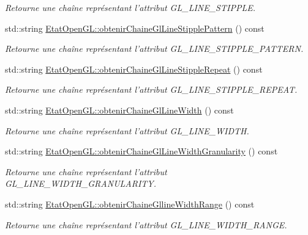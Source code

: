 \begin{DoxyCompactItemize}
\begin{DoxyCompactList}\small\item\em Retourne une chaîne représentant l'attribut G\-L\-\_\-\-L\-I\-N\-E\-\_\-\-S\-T\-I\-P\-P\-L\-E. \end{DoxyCompactList}\item 
std\-::string \hyperlink{group__utilitaire_gaf5594a01ce0e3ce08073c9d8adc2dc7d}{Etat\-Open\-G\-L\-::obtenir\-Chaine\-Gl\-Line\-Stipple\-Pattern} () const 
\begin{DoxyCompactList}\small\item\em Retourne une chaîne représentant l'attribut G\-L\-\_\-\-L\-I\-N\-E\-\_\-\-S\-T\-I\-P\-P\-L\-E\-\_\-\-P\-A\-T\-T\-E\-R\-N. \end{DoxyCompactList}\item 
std\-::string \hyperlink{group__utilitaire_gab9b326741292e41732d5e0b646c4f006}{Etat\-Open\-G\-L\-::obtenir\-Chaine\-Gl\-Line\-Stipple\-Repeat} () const 
\begin{DoxyCompactList}\small\item\em Retourne une chaîne représentant l'attribut G\-L\-\_\-\-L\-I\-N\-E\-\_\-\-S\-T\-I\-P\-P\-L\-E\-\_\-\-R\-E\-P\-E\-A\-T. \end{DoxyCompactList}\item 
std\-::string \hyperlink{group__utilitaire_gacd329652ea9f177db0c0ad44bc9150bd}{Etat\-Open\-G\-L\-::obtenir\-Chaine\-Gl\-Line\-Width} () const 
\begin{DoxyCompactList}\small\item\em Retourne une chaîne représentant l'attribut G\-L\-\_\-\-L\-I\-N\-E\-\_\-\-W\-I\-D\-T\-H. \end{DoxyCompactList}\item 
std\-::string \hyperlink{group__utilitaire_ga42e5a43f490a0f90bedf54064921de10}{Etat\-Open\-G\-L\-::obtenir\-Chaine\-Gl\-Line\-Width\-Granularity} () const 
\begin{DoxyCompactList}\small\item\em Retourne une chaîne représentant l'attribut G\-L\-\_\-\-L\-I\-N\-E\-\_\-\-W\-I\-D\-T\-H\-\_\-\-G\-R\-A\-N\-U\-L\-A\-R\-I\-T\-Y. \end{DoxyCompactList}\item 
std\-::string \hyperlink{group__utilitaire_gacdf3e63f9464f755958fb682f2a45015}{Etat\-Open\-G\-L\-::obtenir\-Chaine\-Glline\-Width\-Range} () const 
\begin{DoxyCompactList}\small\item\em Retourne une chaîne représentant l'attribut G\-L\-\_\-\-L\-I\-N\-E\-\_\-\-W\-I\-D\-T\-H\-\_\-\-R\-A\-N\-G\-E. \end{DoxyCompactList}\item 

\end{DoxyCompactItemize}

